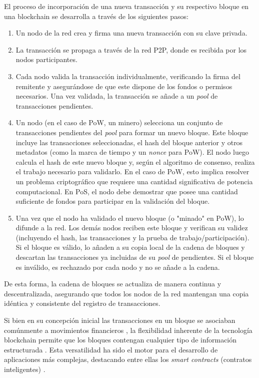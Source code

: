 El proceso de incorporación de una nueva transacción y su respectivo bloque en una blockchain se desarrolla a través de los siguientes pasos:

\begin{enumerate}
    \item Un nodo de la red crea y firma una nueva transacción con su clave privada.
    \item La transacción se propaga a través de la red P2P, donde es recibida por los nodos participantes.
    \item Cada nodo valida la transacción individualmente, verificando la firma del remitente y asegurándose de que este dispone de los fondos o permisos necesarios. Una vez validada, la transacción se añade a un \textit{pool} de transacciones pendientes.
    \item Un nodo (en el caso de PoW, un minero) selecciona un conjunto de transacciones pendientes del \textit{pool} para formar un nuevo bloque. Este bloque incluye las transacciones seleccionadas, el hash del bloque anterior y otros metadatos (como la marca de tiempo y un \textit{nonce} para PoW). El nodo luego calcula el hash de este nuevo bloque y, según el algoritmo de consenso, realiza el trabajo necesario para validarlo. En el caso de PoW, esto implica resolver un problema criptográfico que requiere una cantidad significativa de potencia computacional. En PoS, el nodo debe demostrar que posee una cantidad suficiente de fondos para participar en la validación del bloque.
    \item Una vez que el nodo ha validado el nuevo bloque (o "minado" en PoW), lo difunde a la red. Los demás nodos reciben este bloque y verifican su validez (incluyendo el hash, las transacciones y la prueba de trabajo/participación). Si el bloque es válido, lo añaden a su copia local de la cadena de bloques y descartan las transacciones ya incluidas de su \textit{pool} de pendientes. Si el bloque es inválido, es rechazado por cada nodo y no se añade a la cadena.
\end{enumerate}

De esta forma, la cadena de bloques se actualiza de manera continua y descentralizada, asegurando que todos los nodos de la red mantengan una copia idéntica y consistente del registro de transacciones.

Si bien en su concepción inicial las transacciones en un bloque se asociaban comúnmente a movimientos financieros \cite{satoshi2008bitcoin}, la flexibilidad inherente de la tecnología blockchain permite que los bloques contengan cualquier tipo de información estructurada \cite{bartolomeo2020introduccion}. Esta versatilidad ha sido el motor para el desarrollo de aplicaciones más complejas, destacando entre ellas los \textit{smart contracts} (contratos inteligentes) \cite{sunny2022systematic}.


